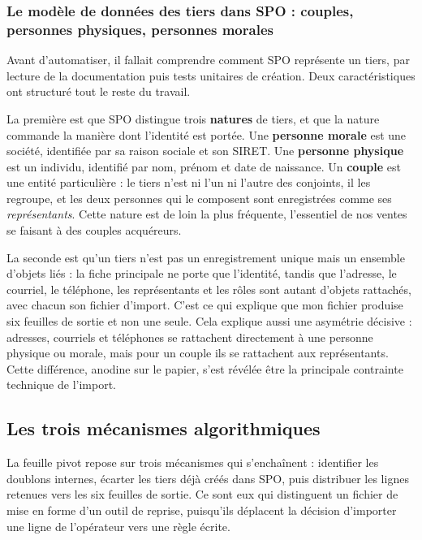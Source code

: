 \hypertarget{le-moduxe8le-de-donnuxe9es-des-tiers-dans-spo-couples-personnes-physiques-personnes-morales}{%
\subsubsection{Le modèle de données des tiers dans SPO : couples, personnes physiques, personnes morales}\label{le-moduxe8le-de-donnuxe9es-des-tiers-dans-spo-couples-personnes-physiques-personnes-morales}}

Avant d'automatiser, il fallait comprendre comment SPO représente un tiers, par lecture de la
documentation puis tests unitaires de création. Deux caractéristiques ont structuré tout le
reste du travail.

La première est que SPO distingue trois \textbf{natures} de tiers, et que la nature commande la
manière dont l'identité est portée. Une \textbf{personne morale} est une société, identifiée par sa
raison sociale et son SIRET. Une \textbf{personne physique} est un individu, identifié par nom,
prénom et date de naissance. Un \textbf{couple} est une entité particulière : le tiers n'est ni l'un
ni l'autre des conjoints, il les regroupe, et les deux personnes qui le composent sont
enregistrées comme ses \emph{représentants}. Cette nature est de loin la plus fréquente, l'essentiel
de nos ventes se faisant à des couples acquéreurs.

La seconde est qu'un tiers n'est pas un enregistrement unique mais un ensemble d'objets liés :
la fiche principale ne porte que l'identité, tandis que l'adresse, le courriel, le téléphone,
les représentants et les rôles sont autant d'objets rattachés, avec chacun son fichier
d'import. C'est ce qui explique que mon fichier produise six feuilles de sortie et non une
seule. Cela explique aussi une asymétrie décisive : adresses, courriels et téléphones se
rattachent directement à une personne physique ou morale, mais pour un couple ils se rattachent
aux représentants. Cette différence, anodine sur le papier, s'est révélée être la principale
contrainte technique de l'import.

\hypertarget{les-trois-muxe9canismes-algorithmiques}{%
\subsection{Les trois mécanismes algorithmiques}\label{les-trois-muxe9canismes-algorithmiques}}

La feuille pivot repose sur trois mécanismes qui s'enchaînent : identifier les doublons
internes, écarter les tiers déjà créés dans SPO, puis distribuer les lignes retenues vers les
six feuilles de sortie. Ce sont eux qui distinguent un fichier de mise en forme d'un outil de
reprise, puisqu'ils déplacent la décision d'importer une ligne de l'opérateur vers une règle
écrite.

